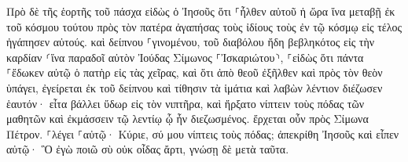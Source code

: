 \documentclass{openreader}
\begin{document}
Πρὸ δὲ τῆς ἑορτῆς τοῦ πάσχα εἰδὼς ὁ Ἰησοῦς ὅτι ⸀ἦλθεν αὐτοῦ ἡ ὥρα ἵνα μεταβῇ ἐκ τοῦ κόσμου τούτου πρὸς τὸν πατέρα ἀγαπήσας τοὺς ἰδίους τοὺς ἐν τῷ κόσμῳ εἰς τέλος ἠγάπησεν αὐτούς. 
καὶ δείπνου ⸀γινομένου, τοῦ διαβόλου ἤδη βεβληκότος εἰς τὴν καρδίαν ⸂ἵνα παραδοῖ αὐτὸν Ἰούδας Σίμωνος ⸀Ἰσκαριώτου⸃, 
⸀εἰδὼς ὅτι πάντα ⸀ἔδωκεν αὐτῷ ὁ πατὴρ εἰς τὰς χεῖρας, καὶ ὅτι ἀπὸ θεοῦ ἐξῆλθεν καὶ πρὸς τὸν θεὸν ὑπάγει, 
ἐγείρεται ἐκ τοῦ δείπνου καὶ τίθησιν τὰ ἱμάτια καὶ λαβὼν λέντιον διέζωσεν ἑαυτόν· 
εἶτα βάλλει ὕδωρ εἰς τὸν νιπτῆρα, καὶ ἤρξατο νίπτειν τοὺς πόδας τῶν μαθητῶν καὶ ἐκμάσσειν τῷ λεντίῳ ᾧ ἦν διεζωσμένος. 
ἔρχεται οὖν πρὸς Σίμωνα Πέτρον. ⸀λέγει ⸀αὐτῷ· Κύριε, σύ μου νίπτεις τοὺς πόδας; 
ἀπεκρίθη Ἰησοῦς καὶ εἶπεν αὐτῷ· Ὃ ἐγὼ ποιῶ σὺ οὐκ οἶδας ἄρτι, γνώσῃ δὲ μετὰ ταῦτα. 
\end{document}
